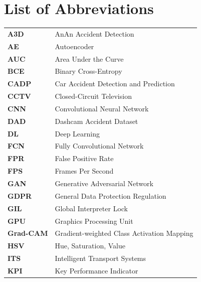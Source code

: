 
\chapter*{\centering List of Abbreviations}

\renewcommand{\arraystretch}{1.5} 

\setlength{\LTleft}{0pt}\setlength{\LTright}{0pt}
\begin{longtable}{p{3cm} p{11cm}} %
        \textbf{A3D} & AnAn Accident Detection \\
        \textbf{AE} & Autoencoder \\
        \textbf{AUC} & Area Under the Curve \\
        \textbf{BCE} & Binary Cross-Entropy \\
        \textbf{CADP} & Car Accident Detection and Prediction \\
        \textbf{CCTV} & Closed-Circuit Television \\
        \textbf{CNN} & Convolutional Neural Network \\
        \textbf{DAD} & Dashcam Accident Dataset \\
        \textbf{DL} & Deep Learning \\
        \textbf{FCN} & Fully Convolutional Network \\
        \textbf{FPR} & False Positive Rate \\
        \textbf{FPS} & Frames Per Second \\
        \textbf{GAN} & Generative Adversarial Network \\
        \textbf{GDPR} & General Data Protection Regulation \\
        \textbf{GIL} & Global Interpreter Lock \\
        \textbf{GPU} & Graphics Processing Unit \\
        \textbf{Grad-CAM} & Gradient-weighted Class Activation Mapping \\
        \textbf{HSV} & Hue, Saturation, Value \\
        \textbf{ITS} & Intelligent Transport Systems \\
        \textbf{KPI} & Key Performance Indicator \\

\end{longtable}
